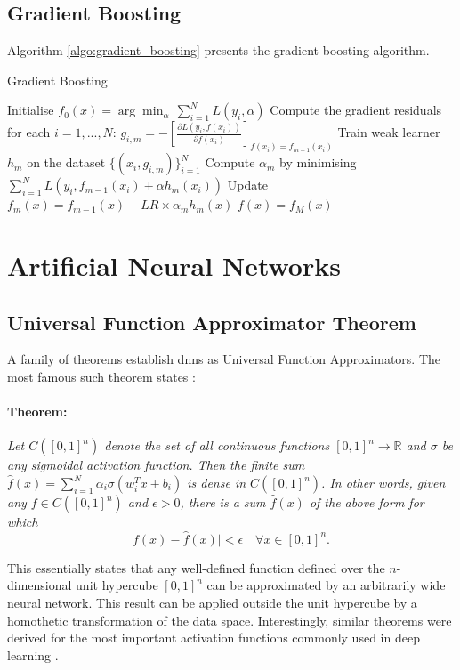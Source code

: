 \subsection{Gradient Boosting}
Algorithm \ref{algo:gradient_boosting} presents the gradient boosting algorithm. 
\begin{algorithm}
    \caption{Gradient Boosting \cite{MurphyML}}
    \label{algo:gradient_boosting}
    \begin{algorithmic}
    \State Initialise $f_0(x) = \arg\min_\alpha \,\sum_{i=1}^N L(y_i, \alpha)$
        \State Compute the gradient residuals for each $i= 1, ..., N$: $g_{i,m} = -\left[\frac{\partial L(y_i, f(x_i))}{\partial f(x_i)}\right]_{f(x_i) = f_{m-1}(x_i)}$
        \State Train weak learner $h_m$ on the dataset $\{(x_i, g_{i,m})\}_{i=1}^N$
        \State Compute $\alpha_m$ by minimising $\sum_{i=1}^N L(y_i, f_{m-1}(x_i) + \alpha h_m(x_i))$
        \State Update $f_m(x) = f_{m-1}(x) + LR \times \alpha_m h_m(x)$
    \EndFor
    \State \Return $f(x) = f_M(x)$
    \end{algorithmic}
\end{algorithm}


\section{Artificial Neural Networks}\label{app:dnn_uni_approx}
\subsection{Universal Function Approximator Theorem}
A family of theorems establish \glspl{dnn} as Universal Function Approximators. The most famous such theorem states \cite{universalFuncApproxNN,HORNIK1989359}:

\paragraph{Theorem:} \textit{Let $C([0, 1]^n)$ denote the set of all continuous functions $[0, 1]^n \rightarrow \mathbb{R}$ and $\sigma$ be any sigmoidal activation function. Then the finite sum $\hat{f}(x) = \sum_{i=1}^N \alpha_i \sigma(w_i^T x + b_i)$ is dense in $C([0, 1]^n)$. In other words, given any $f \in C([0, 1]^n)$ and $\epsilon > 0$, there is a sum $\hat{f}(x)$ of the above form for which \[ f(x) - \hat{f}(x)| < \epsilon \quad \forall x \in [0, 1]^n.\]}

This essentially states that any well-defined function defined over the $n$-dimensional unit hypercube $[0, 1]^n$ can be approximated by an arbitrarily wide neural network. This result can be applied outside the unit hypercube by a homothetic transformation of the data space. Interestingly, similar theorems were derived for the most important activation functions commonly used in deep learning \cite{universApproximator-Relu}.

